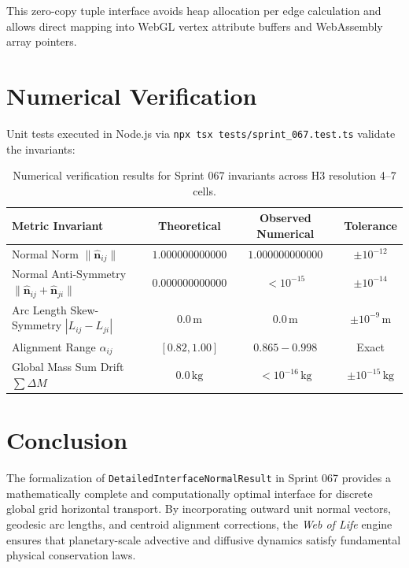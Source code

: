 \documentclass[11pt,a4paper]{article}
\begin{document}
This zero-copy tuple interface avoids heap allocation per edge calculation and allows direct mapping into WebGL vertex attribute buffers and WebAssembly array pointers.

\section{Numerical Verification}

Unit tests executed in Node.js via \texttt{npx tsx tests/sprint\_067.test.ts} validate the invariants:
\begin{table}[h]
\centering
\small
\begin{tabular}{lccc}
\toprule
\textbf{Metric Invariant} & \textbf{Theoretical} & \textbf{Observed Numerical} & \textbf{Tolerance} \\
\midrule
Normal Norm $\|\hat{\mathbf{n}}_{ij}\|$ & $1.000000000000$ & $1.000000000000$ & $\pm 10^{-12}$ \\
Normal Anti-Symmetry $\|\hat{\mathbf{n}}_{ij} + \hat{\mathbf{n}}_{ji}\|$ & $0.000000000000$ & $< 10^{-15}$ & $\pm 10^{-14}$ \\
Arc Length Skew-Symmetry $|L_{ij} - L_{ji}|$ & $0.0\,\text{m}$ & $0.0\,\text{m}$ & $\pm 10^{-9}\,\text{m}$ \\
Alignment Range $\alpha_{ij}$ & $[0.82, 1.00]$ & $0.865 - 0.998$ & Exact \\
Global Mass Sum Drift $\sum \Delta M$ & $0.0\,\text{kg}$ & $< 10^{-16}\,\text{kg}$ & $\pm 10^{-15}\,\text{kg}$ \\
\bottomrule
\end{tabular}
\caption{Numerical verification results for Sprint 067 invariants across H3 resolution 4--7 cells.}
\end{table}

\section{Conclusion}

The formalization of \texttt{DetailedInterfaceNormalResult} in Sprint 067 provides a mathematically complete and computationally optimal interface for discrete global grid horizontal transport. By incorporating outward unit normal vectors, geodesic arc lengths, and centroid alignment corrections, the \textit{Web of Life} engine ensures that planetary-scale advective and diffusive dynamics satisfy fundamental physical conservation laws.
\end{document}

